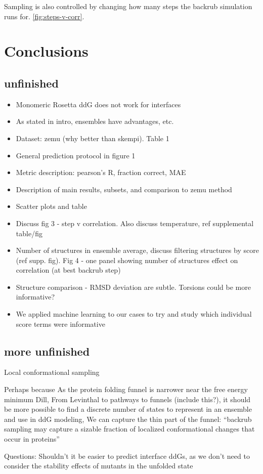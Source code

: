 Sampling is also controlled by changing how many steps the backrub simulation runs for. \cref{fig:steps-v-corr}.

\section{Conclusions}

\subsection{unfinished}

\begin{itemize}
\item Monomeric Rosetta ddG does not work for interfaces
\item As stated in intro, ensembles have advantages, etc.
\item Dataset: zemu (why better than skempi). Table 1
\item General prediction protocol in figure 1
\item Metric description: pearson’s R, fraction correct, MAE
\item Description of main results, subsets, and comparison to zemu method
\item Scatter plots and table
\item Discuss fig 3 - step v correlation. Also discuss temperature, ref supplemental table/fig
\item Number of structures in ensemble average, discuss filtering structures by score (ref supp. fig). Fig 4 - one panel showing number of structures effect on correlation (at best backrub step)
\item Structure comparison - RMSD deviation are subtle. Torsions could be more informative?
\item We applied machine learning to our cases to try and study which individual score terms were informative
\end{itemize}

\subsection{more unfinished}
Local conformational sampling

Perhaps because
As the protein folding funnel is narrower near the free energy minimum {Dill, From Levinthal to pathways to funnels (include this?)}, it should be more possible to find a discrete number of states to represent in an ensemble and use in ddG modeling,
We can capture the thin part of the funnel:
“backrub sampling may capture a sizable fraction of localized conformational changes that occur in proteins” \cite{humphris_prediction_2008}

Questions:
Shouldn’t it be easier to predict interface ddGs, as we don’t need to consider the stability effects of mutants in the unfolded state

